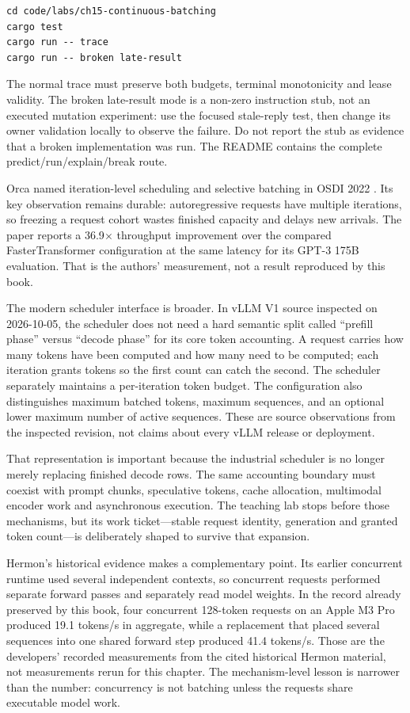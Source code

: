 \begin{verbatim}
cd code/labs/ch15-continuous-batching
cargo test
cargo run -- trace
cargo run -- broken late-result
\end{verbatim}

The normal trace must preserve both budgets, terminal monotonicity and lease
validity. The broken late-result mode is a non-zero instruction stub, not an
executed mutation experiment: use the focused stale-reply test, then change
its owner validation locally to observe the failure. Do not report the stub
as evidence that a broken implementation was run. The README
contains the complete predict/run/explain/break route.


Orca named iteration-level scheduling and selective batching in OSDI 2022
\cite{yu2022orca}. Its key observation remains durable: autoregressive
requests have multiple iterations, so freezing a request cohort wastes
finished capacity and delays new arrivals. The paper reports a 36.9$\times$
throughput improvement over the compared FasterTransformer configuration at
the same latency for its GPT-3 175B evaluation. That is the authors'
measurement, not a result reproduced by this book.

The modern scheduler interface is broader. In vLLM V1 source inspected on
2026-10-05, the scheduler does not need a hard semantic split called
``prefill phase'' versus ``decode phase'' for its core token accounting.
A request carries how many tokens have been computed and how many need to be
computed; each iteration grants tokens so the first count can catch the
second. The scheduler separately maintains a per-iteration token budget.
The configuration also distinguishes maximum batched tokens, maximum
sequences, and an optional lower maximum number of active sequences. These are
source observations from the inspected revision, not claims about every vLLM
release or deployment.

That representation is important because the industrial scheduler is no
longer merely replacing finished decode rows. The same accounting boundary
must coexist with prompt chunks, speculative tokens, cache allocation,
multimodal encoder work and asynchronous execution. The teaching lab stops
before those mechanisms, but its work ticket---stable request identity,
generation and granted token count---is deliberately shaped to survive that
expansion.

Hermon's historical evidence makes a complementary point. Its earlier
concurrent runtime used several independent contexts, so concurrent requests
performed separate forward passes and separately read model weights. In the
record already preserved by this book, four concurrent 128-token requests on
an Apple M3 Pro produced 19.1 tokens/s in aggregate, while a replacement that
placed several sequences into one shared forward step produced 41.4 tokens/s.
Those are the developers' recorded measurements from the cited historical
Hermon material, not measurements rerun for this chapter. The mechanism-level
lesson is narrower than the number: concurrency is not batching unless the
requests share executable model work.

